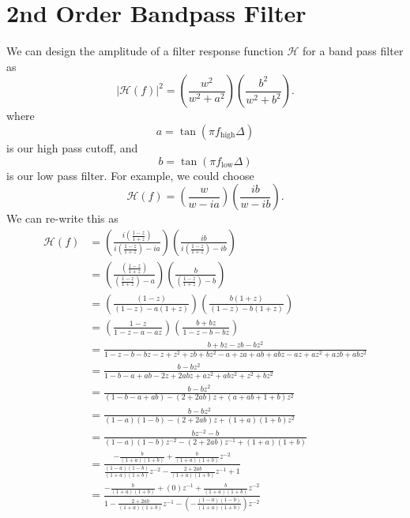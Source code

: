 \documentclass[a4paper]{article}
\begin{document}
\section{2nd Order Bandpass Filter}
We can design the amplitude of a filter response function $\mathcal{H}$ for a band pass filter as
\begin{equation}
|\mathcal{H}(f)|^2 = \left(\frac{w^2}{w^2 + a^2}\right)\left(\frac{b^2}{w^2 + b^2}\right).
\end{equation}
where
\begin{equation}
a = \tan(\pi f_\textrm{high} \Delta)
\end{equation}
is our high pass cutoff, and
\begin{equation}
b = \tan(\pi f_\textrm{low} \Delta)
\end{equation}
is our low pass filter.
For example, we could choose
\begin{equation}
\mathcal{H}(f) = \left(\frac{w}{w - ia}\right)\left(\frac{ib}{w - ib}\right).\label{eq:filter_choice}
\end{equation}
We can re-write this as
\begin{align}
\mathcal{H}(f) & = \left(\frac{i \left(\frac{1-z}{1+z}\right)}{i \left(\frac{1-z}{1+z}\right) - ia}\right)\left(\frac{ib}{i \left(\frac{1-z}{1+z}\right) - ib}\right) \\
 & = \left(\frac{ \left(\frac{1-z}{1+z}\right)}{ \left(\frac{1-z}{1+z}\right) - a}\right)\left(\frac{b}{\left(\frac{1-z}{1+z}\right) - b}\right) \\
 & = \left(\frac{\left(1-z\right)}{ \left(1-z\right) - a(1+z)}\right)\left(\frac{b\left(1+z\right)}{\left(1-z\right) - b\left(1+z\right)}\right) \\
 & = \left(\frac{1-z}{ 1-z - a -az }\right)\left(\frac{b+bz}{1-z- b-bz}\right) \\
 & = \frac{b + bz -zb -bz^2}{1 - z - b - bz -z + z^2 +zb + bz^2 -a +za +ab + abz  -az + az^2 + azb + abz^2 } \\
 & = \frac{b-bz^2}{1 -b -a +ab -2z +2abz +az^2 + abz^2 +z^2 +bz^2} \\
 & = \frac{b-bz^2}{(1 -b  -a +ab) - (2 +2ab)z + (a + ab + 1 +b )z^2} \\
 & = \frac{b-bz^2}{(1-a)(1-b) - (2 +2ab)z + (1 + a)(1 + b)z^2} \\
 & = \frac{bz^{-2}-b}{(1-a)(1-b)z^{-2} - (2 +2ab)z^{-1} + (1 + a)(1 + b)} \\
 & = \frac{-\frac{b}{(1 + a)(1 + b)}+\frac{b}{(1 + a)(1 + b)}z^{-2}}{ \frac{(1-a)(1-b)}{(1 + a)(1 + b)}z^{-2} - \frac{2 +2ab}{(1 + a)(1 + b)}z^{-1} + 1} \\
  & = \frac{-\frac{b}{(1 + a)(1 + b)} + (0) z^{-1} + \frac{b}{(1 + a)(1 + b)}z^{-2}}{1  - \frac{2 +2ab}{(1 + a)(1 + b)}z^{-1} - \left(-\frac{(1-a)(1-b)}{(1 + a)(1 + b)}\right)z^{-2}}
\end{align}
\end{document}
